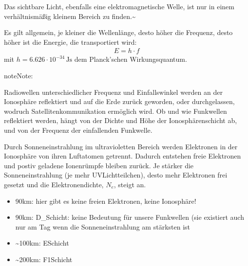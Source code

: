 \documentclass[letterpaper,10pt,english]{jupyterBook}
\begin{document}
\sphinxAtStartPar
Das sichtbare Licht, ebenfalls eine elektromagnetische Welle, ist nur in einem verhältnismäßig kleinem Bereich zu finden.\textasciitilde{}

\sphinxAtStartPar
Es gilt allgemein, je kleiner die Wellenlänge, desto höher die Frequenz, desto höher ist die Energie, die transportiert wird:
\begin{equation*}
\begin{split}E = h \cdot f \end{split}
\end{equation*}
\sphinxAtStartPar
mit \(h = 6.626\cdot 10^{-34}\,\mathrm{Js}\) dem Planck’schen Wirkungsquantum.

\sphinxAtStartPar
{}

\begin{sphinxadmonition}{note}{Note:}
\sphinxAtStartPar
{}

\sphinxAtStartPar
Radiowellen unterschiedlicher Frequenz und Einfallswinkel werden an der Ionosphäre reflektiert und auf die Erde zurück geworden, oder durchgelassen, wodruch Satellitenkommunikation ermöglich wird. Ob und wie Funkwellen reflektiert werden, hängt von der Dichte und Höhe der Ionosphärenschicht ab, und von der Frequenz der einfallenden Funkwelle.

\sphinxAtStartPar
Durch Sonneneinstrahlung im ultravioletten Bereich werden Elektronen in der Ionosphäre von ihren Luftatomen getrennt. Dadurch entstehen freie Elektronen und postiv geladene Ionenrümpfe bleiben zurück. Je stärker die Sonneneinstrahlung (je mehr UV\sphinxhyphen{}Lichtteilchen), desto mehr Elektronen frei gesetzt und die Elektronendichte, \(N_e\), steigt an.
\begin{itemize}
\item {} 
\sphinxhyphen{}90km: hier gibt es keine freien Elektronen, keine Ionosphäre!

\item {} 
\sphinxhyphen{}90km: D\_Schicht: keine Bedeutung für unsere Funkwellen (sie existiert auch nur am Tag wenn die Sonneneinstrahlung am stärksten ist

\item {} 
\sphinxAtStartPar
\textasciitilde{}100km: E\sphinxhyphen{}Schicht

\item {} 
\sphinxAtStartPar
\textasciitilde{}200km: F1\sphinxhyphen{}Schicht


\end{itemize}
\end{sphinxadmonition}
\end{document}
